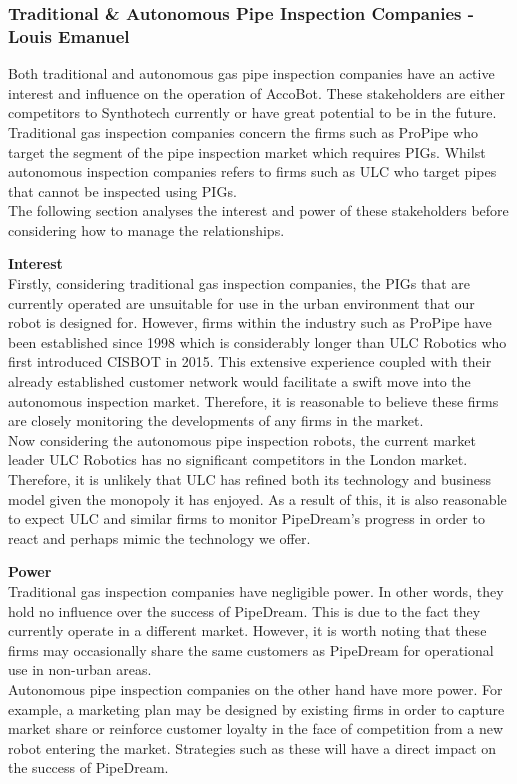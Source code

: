 \documentclass[11pt]{article}		%
\begin{document}
		\subsubsection[Traditional \& Autonomous Pipe Inspection Companies]{Traditional \& Autonomous Pipe Inspection Companies - Louis Emanuel}
            Both traditional and autonomous gas pipe inspection companies have an active interest and influence on the operation of AccoBot. These stakeholders are either competitors to Synthotech currently or have great potential to be in the future. Traditional gas inspection companies concern the firms such as ProPipe who target the segment of the pipe inspection market which requires PIGs. Whilst autonomous inspection companies refers to firms such as ULC who target pipes that cannot be inspected using PIGs. \\
            \hspace*{3ex}The following section analyses the interest and power of these stakeholders before considering how to manage the relationships.
            
            \textbf{Interest}\\
            Firstly, considering traditional gas inspection companies, the PIGs that are currently operated are unsuitable for use in the urban environment that our robot is designed for. However, firms within the industry such as ProPipe have been established since 1998 which is considerably longer than ULC Robotics who first introduced CISBOT in 2015. This extensive experience coupled with their already established customer network would facilitate a swift move into the autonomous inspection market. Therefore, it is reasonable to believe these firms are closely monitoring the developments of any firms in the market. \\
            \hspace*{3ex}Now considering the autonomous pipe inspection robots, the current market leader ULC Robotics has no significant competitors in the London market. Therefore, it is unlikely that ULC has refined both its technology and business model given the monopoly it has enjoyed. As a result of this, it is also reasonable to expect ULC and similar firms to monitor PipeDream's progress in order to react and perhaps mimic the technology we offer. 
            
            \textbf{Power}\\
            Traditional gas inspection companies have negligible power. In other words, they hold no influence over the success of PipeDream. This is due to the fact they currently operate in a different market. However, it is worth noting that these firms may occasionally share the same customers as PipeDream for operational use in non-urban areas. \\
            \hspace*{3ex}Autonomous pipe inspection companies on the other hand have more power. For example, a marketing plan may be designed by existing firms in order to capture market share or reinforce customer loyalty in the face of competition from a new robot entering the market. Strategies such as these will have a direct impact on the success of PipeDream. 
            
\end{document}
